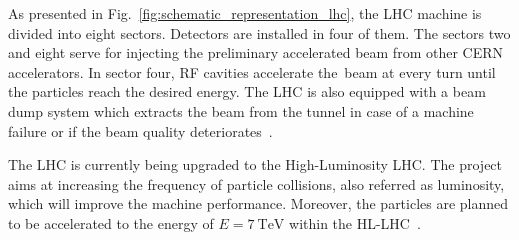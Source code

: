 As presented in Fig.~\ref{fig:schematic_representation_lhc}, the LHC machine is divided into eight sectors. Detectors are installed in four of them. The sectors two and eight serve for injecting the preliminary accelerated beam from other CERN accelerators. In sector four, RF cavities accelerate the~beam at every turn until the particles reach the desired energy. The LHC is also equipped with a beam dump system which extracts the beam from the tunnel in case of a machine failure or if the beam quality deteriorates~\cite[p.~1-4]{maciejewski_cosimulation_transient_effects_in_magnets}. 

The LHC is currently being upgraded to the High-Luminosity LHC. The project aims at increasing the frequency of particle collisions, also referred as luminosity, which will improve the machine performance. Moreover, the particles are planned to be accelerated to the energy of $E=7~\text{TeV}$ within the HL-LHC~\cite{cern_main_webpage}.